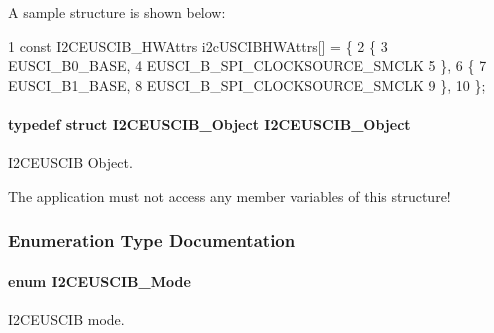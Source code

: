 A sample structure is shown below\+: 
\begin{DoxyCode}
1 const I2CEUSCIB\_HWAttrs i2cUSCIBHWAttrs[] = \{
2     \{
3         EUSCI\_B0\_BASE,
4         EUSCI\_B\_SPI\_CLOCKSOURCE\_SMCLK
5     \},
6     \{
7         EUSCI\_B1\_BASE,
8         EUSCI\_B\_SPI\_CLOCKSOURCE\_SMCLK
9     \},
10 \};
\end{DoxyCode}
\paragraph[{I2\+C\+E\+U\+S\+C\+I\+B\+\_\+\+Object}]{\setlength{\rightskip}{0pt plus 5cm}typedef struct {\bf I2\+C\+E\+U\+S\+C\+I\+B\+\_\+\+Object}  {\bf I2\+C\+E\+U\+S\+C\+I\+B\+\_\+\+Object}}\label{_i2_c_e_u_s_c_i_b_8h_ae6882d1e8a8d4484a9a78d60f02fbe4c}


I2\+C\+E\+U\+S\+C\+I\+B Object. 

The application must not access any member variables of this structure! 

\subsubsection{Enumeration Type Documentation}
\paragraph[{I2\+C\+E\+U\+S\+C\+I\+B\+\_\+\+Mode}]{\setlength{\rightskip}{0pt plus 5cm}enum {\bf I2\+C\+E\+U\+S\+C\+I\+B\+\_\+\+Mode}}\label{_i2_c_e_u_s_c_i_b_8h_a340ba5aa9e4c5a5a8d139aa77d40f63d}


I2\+C\+E\+U\+S\+C\+I\+B mode. 


